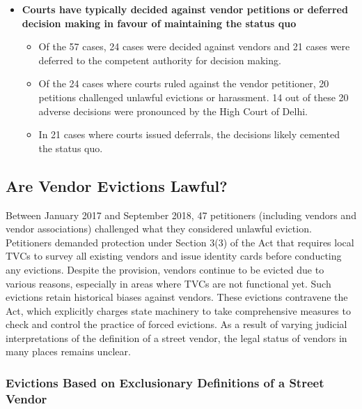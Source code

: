 \documentclass[a4paper, 12pt, twoside]{article}
\begin{document}
{\begin{itemize}[nosep]
\begin{itemize}
\end{itemize}
\end{itemize}

\begin{itemize}
\item \textbf{Courts have typically decided against vendor petitions or deferred decision making in favour of maintaining the status quo}

\begin{itemize}
\item Of the 57 cases, 24 cases were decided against vendors and 21 cases were deferred to the competent authority for decision making.
\item Of the 24 cases where courts ruled against the vendor petitioner, 20 petitions challenged unlawful evictions or harassment. 14 out of these 20 adverse decisions were pronounced by the High Court of Delhi.
\item In 21 cases where courts issued deferrals, the decisions likely cemented the status quo.
\end{itemize}
\end{itemize}

\subsection*{Are Vendor Evictions Lawful?}

Between January 2017 and September 2018, 47 petitioners (including vendors and vendor associations) challenged what they considered unlawful eviction. Petitioners demanded protection under Section 3(3) of the Act that requires local TVCs to survey all existing vendors and issue identity cards before conducting any evictions. Despite the provision, vendors continue to be evicted due to various reasons, especially in areas where TVCs are not functional yet. Such evictions retain historical biases against vendors. These evictions contravene the Act, which explicitly charges state machinery to take comprehensive measures to check and control the practice of forced evictions. As a result of varying judicial interpretations of the definition of a street vendor, the legal status of vendors in many places remains unclear.

\subsubsection*{Evictions Based on Exclusionary Definitions of a Street Vendor}

}
\end{document}
